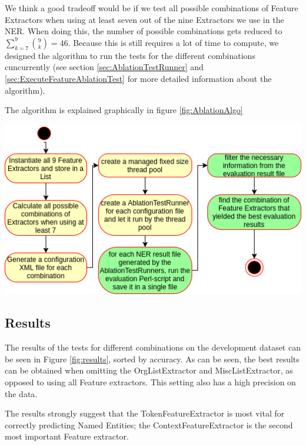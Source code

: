 \documentclass[11pt, english]{article}
\begin{document}
We think a good tradeoff would be if we test all possible combinations of Feature Extractors when using at least seven out of the nine Extractors we use in the NER. When doing this, the number of possible combinations gets reduced to $\sum_{k=7}^{9}\binom{9}{k} = 46$. Because this is still requires a lot of time to compute, we designed the algorithm to run the tests for the different combinations cuncurrently (see section \ref{sec:AblationTestRunner} and \ref{sec:ExecuteFeatureAblationTest} for more detailed information about the algorithm).

The algorithm is explained graphically in figure \ref{fig:AblationAlgo}

\includegraphics[scale=0.75]{gfx/ablationAlgo.png}
\label{fig:AblationAlgo}

\subsection{Results}
\label{sec:AblationResult}
The results of the tests for different combinations on the development dataset can be seen in Figure \ref{fig:results}, sorted by accuracy.
As can be seen, the best results can be obtained when omitting the OrgListExtractor and MiscListExtractor, as opposed to using all Feature extractors.
This setting also has a high precision on the data.

The results strongly suggest that the TokenFeatureExtractor is most vital for correctly predicting Named Entities; the ContextFeatureExtractor is the second most important Feature extractor.
\end{document}
